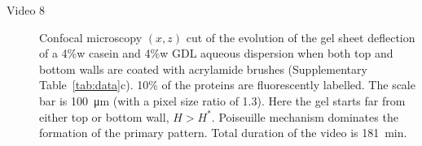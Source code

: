 \documentclass[twocolumn,superscriptaddress,showpacs,preprintnumbers,
amsmath,amssymb,prl]{revtex4-1}
\begin{document}
\begin{description}
\item[Video 8] Confocal microscopy $(x,z)$ cut of the evolution of the gel sheet deflection of a 4\%w casein and 4\%w GDL aqueous dispersion when both top and bottom walls are coated with acrylamide brushes (Supplementary Table~\ref{tab:data}c). 10\% of the proteins are fluorescently labelled. The scale bar is \SI{100}{\micro\metre} (with a pixel size ratio of 1.3). Here the gel starts far from either top or bottom wall, $H>H^*$. Poiseuille mechanism dominates the formation of the primary pattern. Total duration of the video is \SI{181}{\minute}.

\end{description}
\end{document}
